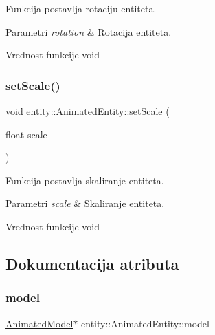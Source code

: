 Funkcija postavlja rotaciju entiteta. 


\begin{DoxyParams}{Parametri}
{\em rotation} & Rotacija entiteta. \\
\hline
\end{DoxyParams}
\begin{DoxyReturn}{Vrednost funkcije}
void 
\end{DoxyReturn}
\mbox{\label{classentity_1_1AnimatedEntity_aee9d22061e72c42ded0d898f43d351c3}} 
\subsubsection{\texorpdfstring{set\+Scale()}{setScale()}}
{\footnotesize\ttfamily void entity\+::\+Animated\+Entity\+::set\+Scale (\begin{DoxyParamCaption}\item[{float}]{scale }\end{DoxyParamCaption})}



Funkcija postavlja skaliranje entiteta. 


\begin{DoxyParams}{Parametri}
{\em scale} & Skaliranje entiteta. \\
\hline
\end{DoxyParams}
\begin{DoxyReturn}{Vrednost funkcije}
void 
\end{DoxyReturn}


\subsection{Dokumentacija atributa}
\mbox{\label{classentity_1_1AnimatedEntity_a1f9e73e14bf1588ed9e7c9e7f7d4aab3}} 
\subsubsection{\texorpdfstring{model}{model}}
{\footnotesize\ttfamily \hyperlink{classmodel_1_1AnimatedModel}{Animated\+Model}$\ast$ entity\+::\+Animated\+Entity\+::model\hspace{0.3cm}{\ttfamily [private]}}



